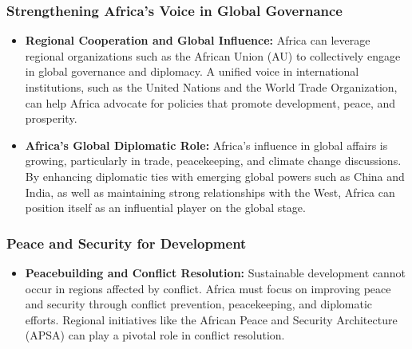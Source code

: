 \documentclass[10pt]{article}
\begin{document}
\subsubsection*{Strengthening Africa's Voice in Global Governance}
\begin{itemize}
  \item \textbf{Regional Cooperation and Global Influence:} Africa can leverage regional
    organizations such as the African Union (AU) to collectively engage in global
    governance and diplomacy. A unified voice in international institutions, such as
    the United Nations and the World Trade Organization, can help Africa advocate
    for policies that promote development, peace, and prosperity.

  \item \textbf{Africa's Global Diplomatic Role:} Africa's influence in global affairs is growing,
    particularly in trade, peacekeeping, and climate change discussions. By
    enhancing diplomatic ties with emerging global powers such as China and India,
    as well as maintaining strong relationships with the West, Africa can position
    itself as an influential player on the global stage.
\end{itemize}

\subsubsection*{Peace and Security for Development}
\begin{itemize}
  \item \textbf{Peacebuilding and Conflict Resolution:} Sustainable development cannot occur in
    regions affected by conflict. Africa must focus on improving peace and security
    through conflict prevention, peacekeeping, and diplomatic efforts. Regional
    initiatives like the African Peace and Security Architecture (APSA) can play a
    pivotal role in conflict resolution.
\end{itemize}
\end{document}
